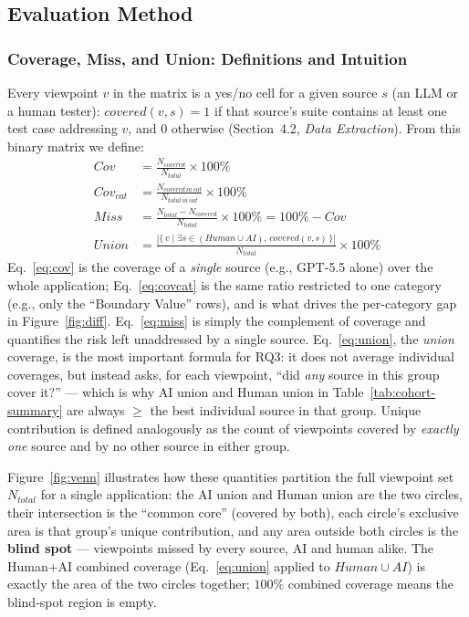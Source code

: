\documentclass[12pt,a4paper]{article}
\begin{document}
\subsection{Evaluation Method}

\subsubsection*{Coverage, Miss, and Union: Definitions and Intuition}
Every viewpoint $v$ in the matrix is a yes/no cell for a given source $s$ (an LLM or a human tester): $covered(v,s)=1$ if that source's suite contains at least one test case addressing $v$, and $0$ otherwise (Section~4.2, \textit{Data Extraction}). From this binary matrix we define:
\begin{align}
    Cov &= \frac{N_{covered}}{N_{total}} \times 100\% \label{eq:cov}\\
    Cov_{cat} &= \frac{N_{covered\,in\,cat}}{N_{total\,in\,cat}} \times 100\% \label{eq:covcat}\\
    Miss &= \frac{N_{total} - N_{covered}}{N_{total}} \times 100\% = 100\% - Cov \label{eq:miss}\\
    Union &= \frac{\left| \{\, v \mid \exists s \in (Human \cup AI),\, covered(v,s) \,\} \right|}{N_{total}} \times 100\% \label{eq:union}
\end{align}
Eq.~\eqref{eq:cov} is the coverage of a \emph{single} source (e.g., GPT-5.5 alone) over the whole application; Eq.~\eqref{eq:covcat} is the same ratio restricted to one category (e.g., only the ``Boundary Value'' rows), and is what drives the per-category gap in Figure~\ref{fig:diff}. Eq.~\eqref{eq:miss} is simply the complement of coverage and quantifies the risk left unaddressed by a single source. Eq.~\eqref{eq:union}, the \emph{union} coverage, is the most important formula for RQ3: it does not average individual coverages, but instead asks, for each viewpoint, ``did \emph{any} source in this group cover it?'' --- which is why AI union and Human union in Table~\ref{tab:cohort-summary} are always $\geq$ the best individual source in that group. Unique contribution is defined analogously as the count of viewpoints covered by \emph{exactly one} source and by no other source in either group.

Figure~\ref{fig:venn} illustrates how these quantities partition the full viewpoint set $N_{total}$ for a single application: the AI union and Human union are the two circles, their intersection is the ``common core'' (covered by both), each circle's exclusive area is that group's unique contribution, and any area outside both circles is the \textbf{blind spot} --- viewpoints missed by every source, AI and human alike. The Human+AI combined coverage (Eq.~\eqref{eq:union} applied to $Human \cup AI$) is exactly the area of the two circles together; $100\%$ combined coverage means the blind-spot region is empty.
\end{document}
